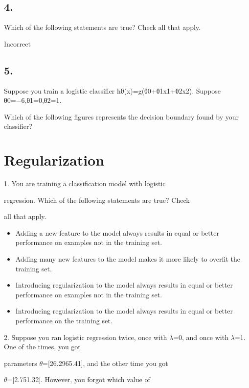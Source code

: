 \subsection{ 4. }
Which of the following statements are true? Check all that apply.

Incorrect
\subsection{ 5. }
Suppose you train a logistic classifier hθ(x)=g(θ0+θ1x1+θ2x2). 
Suppose θ0=−6,θ1=0,θ2=1. 

Which of the following figures represents the decision boundary found by your classifier?


\section{ Regularization }

1. 
You are training a classification model with logistic

regression. Which of the following statements are true? Check

all that apply.

\begin{itemize}
\item 
Adding a new feature to the model always results in equal or better performance on examples not in the training set.
\item 
Adding many new features to the model makes it more likely to overfit the training set.
\item 
Introducing regularization to the model always results in equal or better performance on examples not in the training set.
\item 
Introducing regularization to the model always results in equal or better performance on the training set.
\end{itemize}
2. 
Suppose you ran logistic regression twice, once with $\lambda$=0, and once with $\lambda$=1. One of the times, you got

parameters $\theta$=[26.2965.41], and the other time you got

$\theta$=[2.751.32]. However, you forgot which value of

